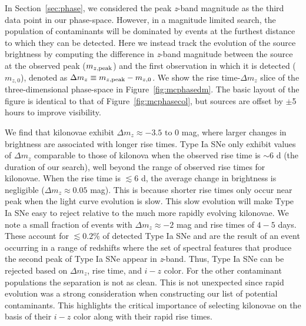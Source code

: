 In Section~\ref{sec:phase}, we considered the peak {\em z}-band magnitude as the third data point in our phase-space. However, in a magnitude limited search, the population of contaminants will be dominated by events at the furthest distance to which they can be detected. Here we instead track the evolution of the source brightness by computing the difference in {\em z}-band magnitude between the source at the observed peak ($m_{z,{\rm peak}}$) and the first observation in which it is detected ($m_{z,0}$), denoted as $\Delta m_z \equiv m_{z,{\rm peak}} - m_{z,0}$. We show the rise time-$\Delta m_z$ slice of the three-dimensional phase-space in Figure~\ref{fig:mcphasedm}. The basic layout of the figure is identical to that of Figure~\ref{fig:mcphasecol}, but sources are offset by $\pm$5 hours to improve visibility.
   
We find that kilonovae exhibit $\Delta m_z \approx -3.5\text{ to }0$ mag, where larger changes in brightness are associated with longer rise times. Type Ia SNe only exhibit values of $\Delta m_z$ comparable to those of kilonova when the observed rise time is $\sim6$ d (the duration of our search), well beyond the range of observed rise times for kilonovae. When the rise time is $\lesssim6$ d, the average change in brightness is negligible ($\Delta m_z \approx 0.05$ mag). This is because shorter rise times only occur near peak when the light curve evolution is slow. This slow evolution will make Type Ia SNe easy to reject relative to the much more rapidly evolving kilonovae. We note a small fraction of events with $\Delta m_z \approx -2$ mag and rise times of $4-5$ days. These account for $\lesssim0.2\%$ of detected Type Ia SNe and are the result of an event occurring in a range of redshifts where the set of spectral features that produce the second peak of Type Ia SNe appear in {\em z}-band. Thus, Type Ia SNe can be rejected based on $\Delta m_z$, rise time, and $i-z$ color. For the other contaminant populations the separation is not as clean. This is not unexpected since rapid evolution was a strong consideration when constructing our list of potential contaminants. This highlights the critical importance of selecting kilonovae on the basis of their $i-z$ color along with their rapid rise times. 
   
